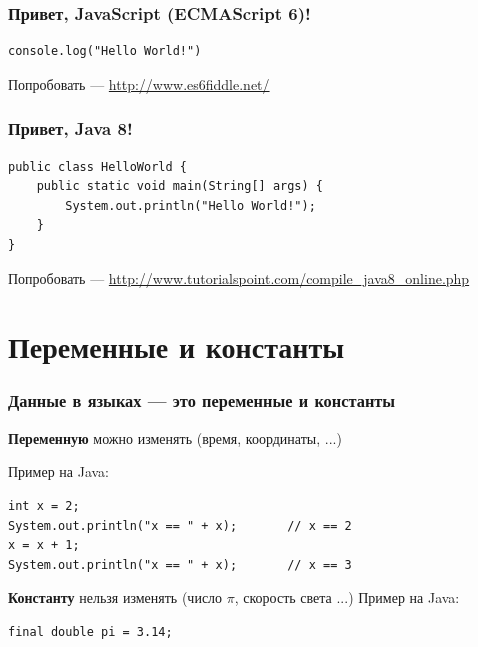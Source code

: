 {\begin{frame}[fragile]
  \frametitle{Привет, JavaScript (ECMAScript 6)!}
  \begin{verbatim}
console.log("Hello World!")
  \end{verbatim}
  \vspace{2cm}
  Попробовать --- \url{http://www.es6fiddle.net/}
\end{frame}

\begin{frame}[fragile]
  \frametitle{Привет, Java 8!}
  \begin{verbatim}
public class HelloWorld {
    public static void main(String[] args) {
        System.out.println("Hello World!");
    }
}
  \end{verbatim}
  \vspace{2cm}
  Попробовать --- \url{http://www.tutorialspoint.com/compile\_java8\_online.php}
\end{frame}

\section{Переменные и константы}
\begin{frame}[fragile]
  \frametitle{Данные в языках --- это переменные и константы}
  \textbf{Переменную} можно изменять (время, координаты, ...)

  Пример на Java:
  \begin{verbatim}
int x = 2;
System.out.println("x == " + x);       // x == 2
x = x + 1;
System.out.println("x == " + x);       // x == 3
  \end{verbatim}
  \vspace{1cm}
  \textbf{Константу} нельзя изменять (число $\pi$, скорость света ...)
  Пример на Java:
  \begin{verbatim}
final double pi = 3.14;
  \end{verbatim}
\end{frame}


}
